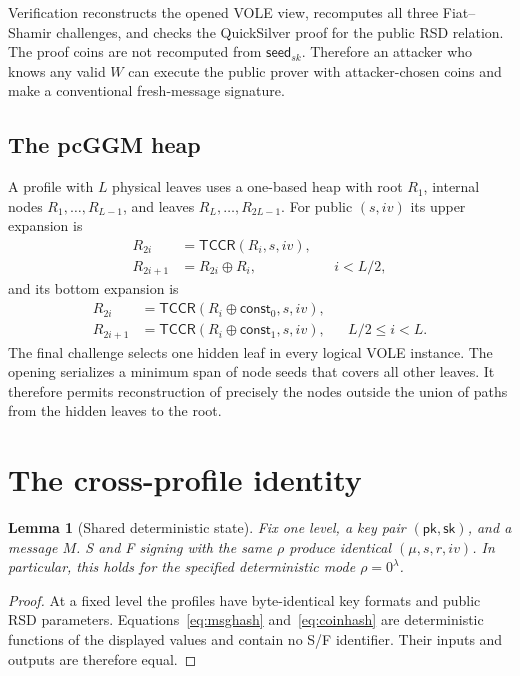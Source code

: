 \documentclass[11pt,a4paper]{article}
\newtheorem{lemma}[theorem]{Lemma}
\newcommand{\xor}{\mathbin{\oplus}}
\newcommand{\pk}{\ensuremath{\mathsf{pk}}}
\newcommand{\sk}{\ensuremath{\mathsf{sk}}}
\newcommand{\TCCR}{\ensuremath{\mathsf{TCCR}}}
\begin{document}
Verification reconstructs the opened VOLE view, recomputes all three
Fiat--Shamir challenges, and checks the QuickSilver proof for the public RSD
relation.  The proof coins are not recomputed from $\mathsf{seed}_{sk}$.
Therefore an attacker who knows any valid $W$ can execute the public prover
with attacker-chosen coins and make a conventional fresh-message signature.

\subsection{The pcGGM heap}

A profile with $L$ physical leaves uses a one-based heap with root $R_1$,
internal nodes $R_1,\ldots,R_{L-1}$, and leaves
$R_L,\ldots,R_{2L-1}$.  For public $(s,iv)$ its upper expansion is
\begin{align}
 R_{2i}&=\TCCR(R_i,s,iv),\nonumber\\
 R_{2i+1}&=R_{2i}\xor R_i, && i<L/2,                           \label{eq:upper}
\end{align}
and its bottom expansion is
\begin{align}
 R_{2i}&=\TCCR(R_i\xor\mathsf{const}_0,s,iv),\nonumber\\
 R_{2i+1}&=\TCCR(R_i\xor\mathsf{const}_1,s,iv),
                       && L/2\leq i<L.                         \label{eq:bottom}
\end{align}
The final challenge selects one hidden leaf in every logical VOLE instance.
The opening serializes a minimum span of node seeds that covers all other
leaves.  It therefore permits reconstruction of precisely the nodes outside
the union of paths from the hidden leaves to the root.

\section{The cross-profile identity}

\begin{lemma}[Shared deterministic state]\label{lem:state}
Fix one level, a key pair $(\pk,\sk)$, and a message $M$.  S and F signing with
the same $\rho$ produce identical $(\mu,s,r,iv)$.  In particular, this holds
for the specified deterministic mode $\rho=0^\lambda$.
\end{lemma}
\begin{proof}
At a fixed level the profiles have byte-identical key formats and public RSD
parameters.  Equations~\eqref{eq:msghash} and~\eqref{eq:coinhash} are
deterministic functions of the displayed values and contain no S/F identifier.
Their inputs and outputs are therefore equal.
\end{proof}
\end{document}
